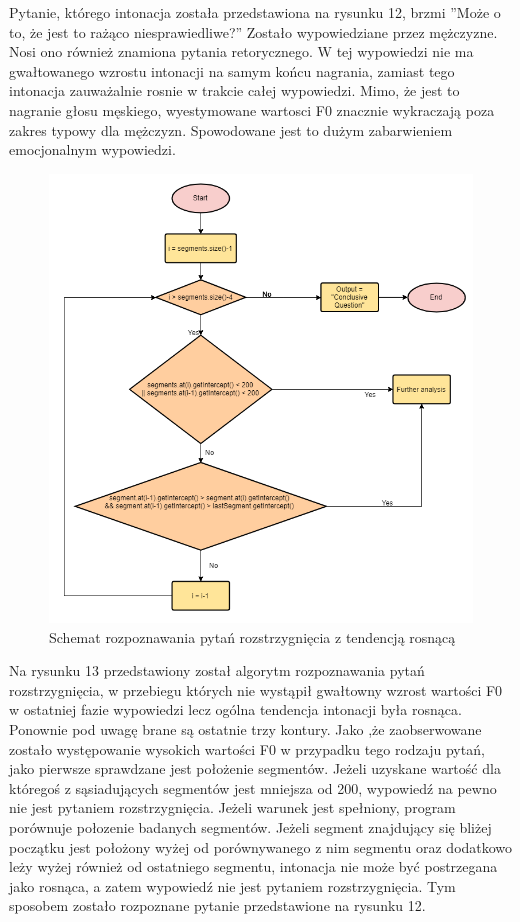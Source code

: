\documentclass[a4paper,12 pt]{article}
\begin{document}
\FloatBarrier
Pytanie, którego intonacja została przedstawiona na rysunku 12, brzmi ''Może o to, że jest to rażąco niesprawiedliwe?'' Zostało wypowiedziane przez mężczyzne. Nosi ono również znamiona pytania retorycznego.  W tej wypowiedzi nie ma gwałtowanego wzrostu intonacji na samym końcu nagrania, zamiast tego intonacja zauważalnie rosnie w trakcie całej wypowiedzi. Mimo, że jest to nagranie głosu męskiego, wyestymowane wartosci F0 znacznie wykraczają poza zakres typowy dla mężczyzn. Spowodowane jest to dużym zabarwieniem emocjonalnym wypowiedzi.
 \FloatBarrier
\begin{figure}[h]
\centering
\includegraphics[scale=0.9]{conclusive2.png}
\caption{Schemat rozpoznawania pytań rozstrzygnięcia z tendencją rosnącą}
\end{figure}
\FloatBarrier
Na rysunku 13 przedstawiony został algorytm rozpoznawania pytań rozstrzygnięcia, w przebiegu których nie wystąpił gwałtowny wzrost wartości F0 w ostatniej fazie wypowiedzi lecz ogólna tendencja intonacji była rosnąca.
Ponownie pod uwagę brane są ostatnie trzy kontury. Jako ,że zaobserwowane zostało występowanie wysokich wartości F0 w przypadku tego rodzaju pytań, jako pierwsze sprawdzane jest położenie segmentów. Jeżeli uzyskane wartość dla któregoś z sąsiadujących segmentów jest mniejsza od 200, wypowiedź na pewno nie jest pytaniem rozstrzygnięcia. Jeżeli warunek jest spełniony, program porównuje połozenie badanych segmentów. Jeżeli segment znajdujący się bliżej początku jest położony wyżej od porównywanego z nim segmentu oraz dodatkowo leży wyżej również od ostatniego segmentu, intonacja nie może być postrzegana jako rosnąca, a zatem wypowiedź nie jest pytaniem rozstrzygnięcia. Tym sposobem zostało rozpoznane pytanie przedstawione na rysunku 12.
\end{document}
